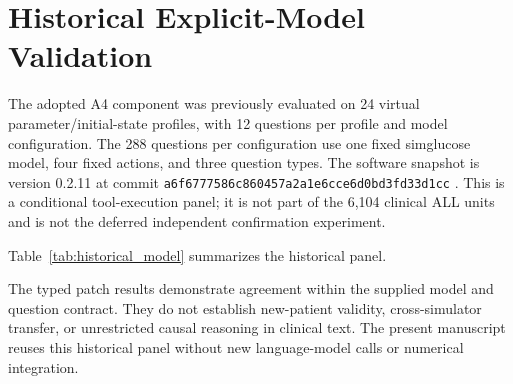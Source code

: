 \section{Historical Explicit-Model Validation}
\label{sec:appendix_model}

The adopted A4 component was previously evaluated on 24 virtual parameter/initial-state
profiles, with 12 questions per profile and model configuration. The 288 questions per
configuration use one fixed simglucose model, four fixed actions, and three question
types. The software snapshot is version 0.2.11 at commit
\texttt{a6f6777586c860457a2a1e6cce6d0bd3fd33d1cc} \citep{simglucose}. This is a
conditional tool-execution panel; it is not part of the 6,104 clinical ALL units and is
not the deferred independent confirmation experiment.

Table~\ref{tab:historical_model} summarizes the historical panel.



The typed patch results demonstrate agreement within the supplied model and question
contract. They do not establish new-patient validity, cross-simulator transfer, or
unrestricted causal reasoning in clinical text. The present manuscript reuses this
historical panel without new language-model calls or numerical integration.
